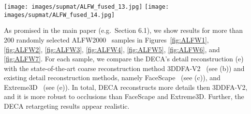 \documentclass[final]{cvpr}
\newcommand{\modelname}{DECA\xspace}
\newcommand{\imsize}{0.48}
\begin{document}
\begin{appendices}
\begin{figure*}[t]
    \texttt{[image: images/supmat/ALFW\_fused\_13.jpg]}
    \texttt{[image: images/supmat/ALFW\_fused\_14.jpg]}
    \caption{Qualitative comparisons on random ALFW2000~\cite{Zhu2015} samples. a) Input image, b) 3DDFA-V2~\cite{guo2020towards}, c) FaceScape~\cite{yang2020facescape}, d) Extreme3D~\cite{AnhTran2018}, e) \modelname detail reconstruction, and f) reposing (animation) of \modelname's detail reconstruction to a common expression. The expression in (i) is from the source expression E in Figure 2 of the main paper. Blank entries indicate that the particular method did not return any reconstructed mesh. }
    \label{fig:ALFW7}
\end{figure*}

As promised in the main paper (e.g.~Section 6.1), we show results for more than 200 randomly selected ALFW2000~\cite{Zhu2015} samples in Figures~\ref{fig:ALFW1}, \ref{fig:ALFW2}, \ref{fig:ALFW3}, \ref{fig:ALFW4}, \ref{fig:ALFW5}, \ref{fig:ALFW6}, and \ref{fig:ALFW7}.
For each sample, we compare the \modelname's detail reconstruction (e) with the state-of-the-art coarse reconstruction method 3DDFA-V2~\cite{guo2020towards} (see (b)) and existing detail reconstruction methods, namely FaceScape~\cite{yang2020facescape} (see (c)), and Extreme3D~\cite{AnhTran2018} (see (e)).
 In total, \modelname reconstructs more details then 3DDFA-V2, and it is more robust to occlusions than FaceScape and Extreme3D. 
 Further, the \modelname retargeting results appear realistic.

\end{appendices} 
\end{document}
